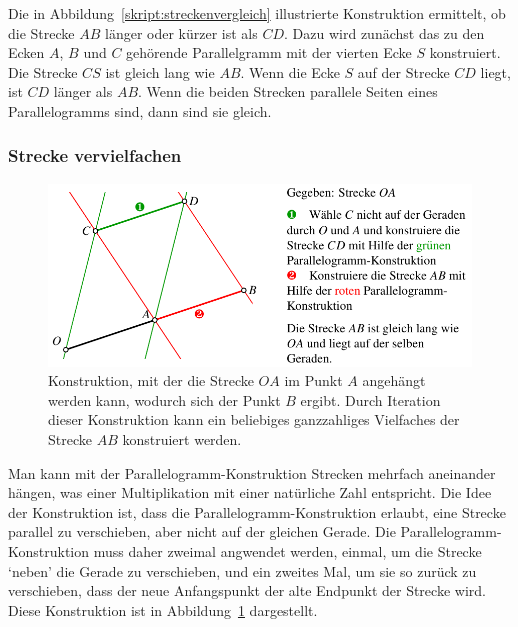 Die in Abbildung~\ref{skript:streckenvergleich} illustrierte Konstruktion
ermittelt, ob die Strecke $AB$ länger oder kürzer ist als $CD$.
Dazu wird zunächst das zu den Ecken $A$, $B$ und $C$ gehörende Parallelgramm 
mit der vierten Ecke $S$ konstruiert.
Die Strecke $CS$ ist gleich lang wie $AB$.
Wenn die Ecke $S$ auf der Strecke $CD$ liegt, ist $CD$ länger als $AB$.
Wenn die beiden Strecken parallele Seiten eines Parallelogramms sind, dann
sind sie gleich.

\subsubsection{Strecke vervielfachen}
\begin{figure}
\centering
\includegraphics{3/images/streckenvervielfachung.pdf}
\caption{Konstruktion, mit der die Strecke $OA$ im Punkt $A$ angehängt
werden kann, wodurch sich der Punkt $B$ ergibt.
Durch Iteration dieser Konstruktion kann ein beliebiges ganzzahliges
Vielfaches der Strecke $AB$ konstruiert werden.
\label{skript:streckenvervielfachung}}
\end{figure}
Man kann mit der Parallelogramm-Konstruktion Strecken mehrfach
aneinander hängen, was einer Multiplikation mit einer natürliche
Zahl entspricht.
Die Idee der Konstruktion ist, dass die Parallelogramm-Konstruktion
erlaubt, eine Strecke parallel zu verschieben, aber nicht auf der
gleichen Gerade.
Die Parallelogramm-Konstruktion muss daher zweimal angwendet werden,
einmal, um die Strecke `neben' die Gerade zu verschieben, und ein
zweites Mal, um sie so zurück zu verschieben, dass der neue Anfangspunkt
der alte Endpunkt der Strecke wird.
Diese Konstruktion ist in Abbildung~\ref{skript:streckenvervielfachung}
dargestellt.


